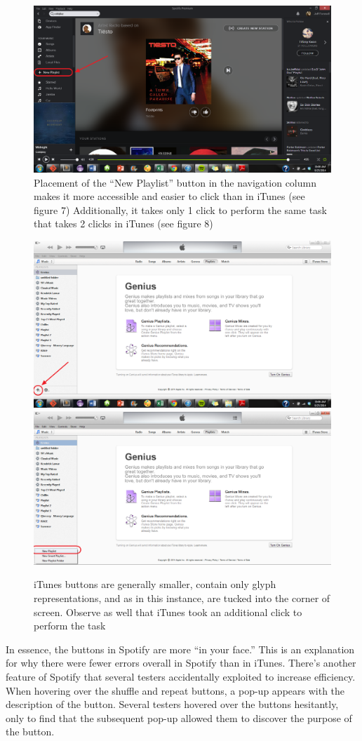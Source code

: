 \documentclass[12pt]{article}
\begin{document}
\begin{figure}[H]
	\centering
	\includegraphics[width=.75\textwidth]{chart8.png}
	\caption{Placement of the ``New Playlist'' button in the 
navigation column makes it more accessible and easier to click 
than in iTunes (see figure 7) Additionally, it takes only 1 click 
to perform the same task that takes 2 clicks in iTunes (see figure 
8)}
\end{figure}

\begin{figure}[H]
	\centering
	\includegraphics[width=.4\textwidth]{chart7.png}
	\includegraphics[width=.4\textwidth]{chart9.png}
	\caption{iTunes buttons are generally smaller, contain 
only glyph representations, and as in this instance, are tucked 
into the corner of screen. Observe as well that iTunes took an additional click to perform the task}
\end{figure}



 In essence, the buttons in Spotify are more ``in your face.'' This 
is an explanation for why there were fewer errors overall in 
Spotify than in iTunes. There's another feature of Spotify that 
several testers accidentally exploited to increase efficiency. 
When hovering over the shuffle and repeat buttons, a pop-up 
appears with the description of the button. Several testers 
hovered over the buttons hesitantly, only to find that the 
subsequent pop-up allowed them to discover the purpose of the 
button.
\end{document}
